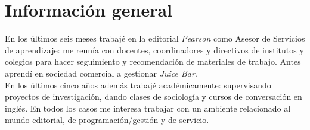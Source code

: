 \documentclass[a4paper,hidelinks]{twentysecondcv} %
\begin{document}

\section{Información general}


En los últimos seis meses trabajé en la editorial \textit{Pearson} como Asesor de Servicios de aprendizaje: me reunía con docentes, coordinadores y directivos de institutos y colegios para hacer seguimiento y recomendación de materiales de trabajo. 
Antes aprendí en sociedad comercial a gestionar \textit{Juice Bar}.
\\
En los últimos cinco años además trabajé académicamente: supervisando proyectos de investigación, dando clases de sociología y cursos de conversación en inglés. En todos los casos me interesa trabajar con un ambiente relacionado al mundo editorial, de programación/gestión y de servicio.

\end{document}
